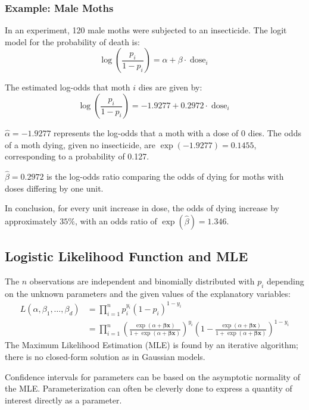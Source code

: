 \documentclass{article}
\begin{document}
\subsubsection{Example: Male Moths}

In an experiment, 120 male moths were subjected to an insecticide. The logit model for the probability of death is:
$$
\log \left(\frac{p_{i}}{1-p_{i}}\right) = \alpha + \beta \cdot \operatorname{dose}_{i}
$$

The estimated log-odds that moth $i$ dies are given by:
$$
\log \left(\frac{p_{i}}{1-p_{i}}\right) = -1.9277 + 0.2972 \cdot \operatorname{dose}_{i}
$$

$\hat{\alpha} = -1.9277$ represents the log-odds that a moth with a dose of 0 dies. The odds of a moth dying, given no insecticide, are $\exp (-1.9277) = 0.1455$, corresponding to a probability of 0.127.

$\hat{\beta} = 0.2972$ is the log-odds ratio comparing the odds of dying for moths with doses differing by one unit.

In conclusion, for every unit increase in dose, the odds of dying increase by approximately $35\%$, with an odds ratio of $\exp (\hat{\beta}) = 1.346$.

\subsection{Logistic Likelihood Function and MLE}

The $n$ observations are independent and binomially distributed with $p_{i}$ depending on the unknown parameters and the given values of the explanatory variables:
$$
\begin{aligned}
L\left(\alpha, \beta_{1}, \ldots, \beta_{d}\right) & =\prod_{i=1}^{n} p_{i}^{y_{i}}\left(1-p_{i}\right)^{1-y_{i}} \\
& =\prod_{i=1}^{n}\left(\frac{\exp (\alpha+\boldsymbol{\beta} \boldsymbol{x})}{1+\exp (\alpha+\boldsymbol{\beta} \boldsymbol{x})}\right)^{y_{i}}\left(1-\frac{\exp (\alpha+\boldsymbol{\beta} \boldsymbol{x})}{1+\exp (\alpha+\boldsymbol{\beta} \boldsymbol{x})}\right)^{1-y_{i}}
\end{aligned}
$$
The Maximum Likelihood Estimation (MLE) is found by an iterative algorithm; there is no closed-form solution as in Gaussian models.

Confidence intervals for parameters can be based on the asymptotic normality of the MLE. Parameterization can often be cleverly done to express a quantity of interest directly as a parameter.
\end{document}
